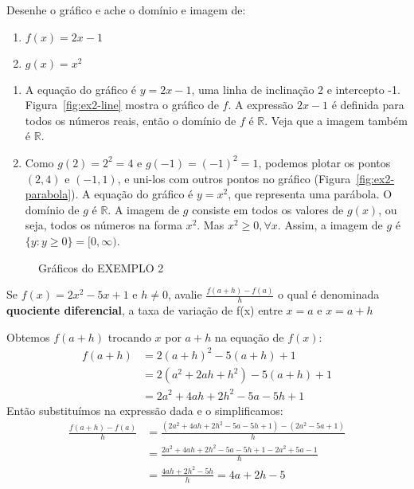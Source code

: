  Desenhe o gráfico e ache o domínio e imagem de:
\vspace{-0.7cm}\begin{multicols}{2}
  \begin{enumerate}[label=(\alph*)]
    \item $f(x)=2x-1$
    \item $g(x)=x^2$
  \end{enumerate}
\end{multicols}\vspace{-0.3cm}
\solution
\begin{enumerate}[label=(\alph*)]
  \item A equação do gráfico é $y=2x-1$, uma linha de inclinação 2 e intercepto -1. Figura~\ref{fig:ex2-line} mostra o gráfico de $f$. A expressão $2x-1$ é definida para todos os números reais, então o domínio de $f$ é $\mathds{R}$. Veja que a imagem também é $\mathds{R}$.
  \item Como $g(2)= 2^2 = 4$ e $g(-1) = (-1)^2 = 1$, podemos plotar os pontos $(2,4)$ e $(-1,1)$, e uni-los com outros pontos no gráfico (Figura~\ref{fig:ex2-parabola}). A equação do gráfico é $y=x^2$, que representa uma parábola. O domínio de $g$ é $\mathds{R}$. A imagem de $g$ consiste em todos os valores de $g(x)$, ou seja, todos os números na forma $x^2$. Mas $x^2\geq 0, \forall x$. Assim, a imagem de $g$ é $\{y:y\geq 0\} = [0,\infty)$.\vspace{-0.3cm}
\end{enumerate}
\begin{figure}[!ht]
  \centering
  \caption{Gráficos do EXEMPLO 2}
\end{figure}\vspace{-0.4cm}
 Se $f(x)=2x^2-5x+1$ e $h\neq 0$, avalie $\displaystyle\frac{f(a+h)-f(a)}{h}$ o qual é denominada \textbf{quociente diferencial}, a taxa de variação de f(x) entre $x=a$ e $x=a+h$

\solution

\noindent Obtemos $f(a+h)$ trocando $x$ por $a+h$ na equação de $f(x)$:
$$
\begin{aligned}
f(a+h) &=2(a+h)^2-5(a+h)+1\\
&= 2(a^2+2ah+h^2)-5(a+h)+1\\
&=2a^2+4ah+2h^2-5a-5h+1
\end{aligned}
$$
Então substituímos na expressão dada e o simplificamos: $$
\begin{aligned}
\frac{f(a+h)-f(a)}{h} &= \frac{(2a^2+4ah+2h^2-5a-5h+1)-(2a^2-5a+1)}{h}\\
&=\frac{2a^2+4ah+2h^2-5a-5h+1-2a^2+5a-1}{h}\\
&=\frac{4ah+2h^2-5h}{h}=4a+2h-5
\end{aligned}
$$
